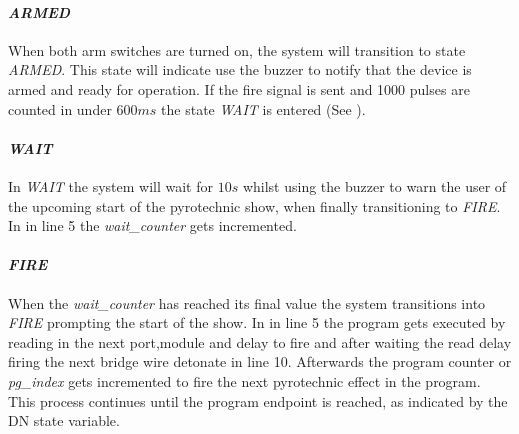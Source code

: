 

\paragraph{\textit{ARMED}}
When both arm switches are turned on, the system will transition to state \textit{ARMED}. This state will indicate use the buzzer to notify that the device is armed and ready for operation. If the fire signal is sent and 1000 pulses are counted in under $600ms$ the state \textit{WAIT} is entered (See ).\\



\paragraph{\textit{WAIT}}

In \textit{WAIT} the system will wait for $10s$ whilst using the buzzer to warn the user of the upcoming start of the pyrotechnic show, when finally transitioning to \textit{FIRE}. In  in line 5 the \textit{wait\_counter} gets incremented. 



\pagebreak

\paragraph{\textit{FIRE}}
When the \textit{wait\_counter} has reached its final value the system transitions into \textit{FIRE} prompting the start of the show. In  in line 5 the program gets executed by reading in the next port,module and delay to fire and after waiting the read delay firing the next bridge wire detonate in line 10. Afterwards the program counter or \textit{pg\_index} gets incremented to fire the next pyrotechnic effect in the program. This process continues until the program endpoint is reached, as indicated by the DN state variable.\\

